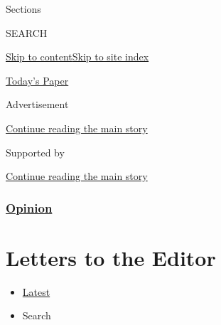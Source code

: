 Sections

SEARCH

\protect\hyperlink{site-content}{Skip to
content}\protect\hyperlink{site-index}{Skip to site index}

\href{https://myaccount.nytimes.com/auth/login?response_type=cookie\&client_id=vi}{}

\href{https://www.nytimes.com/section/todayspaper}{Today's Paper}

Advertisement

\protect\hyperlink{after-top}{Continue reading the main story}

Supported by

\protect\hyperlink{after-sponsor}{Continue reading the main story}

\hypertarget{opinion}{%
\subsubsection{\texorpdfstring{\href{/section/opinion}{Opinion}}{Opinion}}\label{opinion}}

\hypertarget{letters-to-the-editor}{%
\section{Letters to the Editor}\label{letters-to-the-editor}}

\begin{itemize}
\tightlist
\item
  \protect\hyperlink{stream-panel}{Latest}
\item
  Search
\end{itemize}

